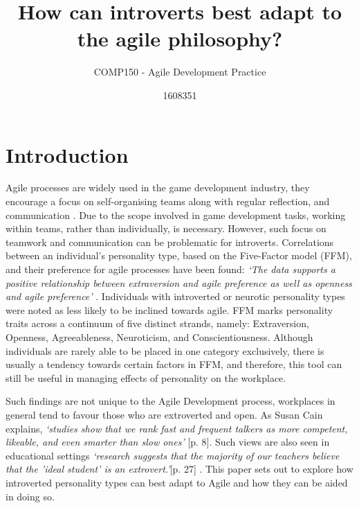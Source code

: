 \documentclass{scrartcl}
\title{How can introverts best adapt to the agile philosophy?}
\subtitle{COMP150 - Agile Development Practice}
\author{1608351}
\begin{document}
\maketitle


\section{Introduction}

Agile processes are widely used in the game development industry, they encourage a focus on self-organising teams along with regular reflection, and communication \cite{Agile}. Due to the scope involved in game development tasks, working within teams, rather than individually, is necessary. However, such focus on teamwork and communication can be problematic for introverts. Correlations between an individual's personality type, based on the Five-Factor model (FFM), and their preference for agile processes have been found: \textit{`The data supports a positive relationship between extraversion and agile preference as well as openness and agile preference'} \cite[p. 4756]{BishopDeokar}. Individuals with introverted or neurotic personality types were noted as less likely to be inclined towards agile. FFM marks personality traits across a continuum of five distinct strands, namely: Extraversion, Openness, Agreeableness, Neuroticism, and Conscientiousness. Although individuals are rarely able to be placed in one category exclusively, there is usually a tendency towards certain factors in FFM, and therefore, this tool can still be useful in managing effects of personality on the workplace.

Such findings are not unique to the Agile Development process, workplaces in general tend to favour those who are extroverted and open. As Susan Cain explains, \textit{`studies show that we rank fast and frequent talkers as more competent, likeable, and even smarter than slow ones' }[p. 8]\cite{Cain}. Such views are also seen in educational settings \textit{`research suggests that the majority of our teachers believe that the 'ideal student' is an extrovert.'}[p. 27] \cite{Cain}. This paper sets out to explore how introverted personality types can best adapt to Agile and how they can be aided in doing so.
\end{document}
